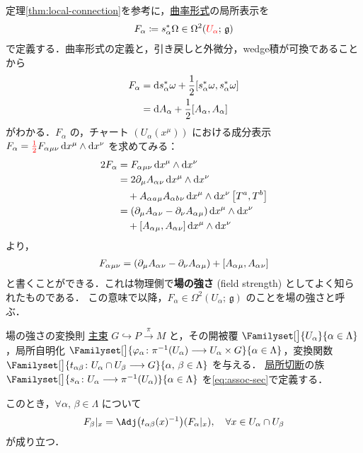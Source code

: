 \documentclass[geometry_main]{subfiles}
\begin{document}
定理\ref{thm:local-connection}を参考に，\hyperref[def:curvature]{曲率形式}の局所表示を
\begin{align}
    \label{def:field-strength}
    F_\alpha \coloneqq s_\alpha^* \Omega \in \Omega^2 (\textcolor{red}{U_\alpha};\, \mathfrak{g})
\end{align}
で定義する．曲率形式の定義と，引き戻しと外微分，wedge積が可換であることから
\begin{align}
    F_\alpha 
    &= \dd s_\alpha^* \omega + \frac{1}{2} \comm{s_\alpha^* \omega}{s_\alpha^* \omega} \\
    &= \dd{A_\alpha} + \frac{1}{2} \comm{A_\alpha}{A_\alpha}
\end{align}
がわかる．$F_\alpha$ の，チャート $(U_\alpha (x^\mu))$ における成分表示 $F_\alpha = \textcolor{red}{\frac{1}{2}} F_\alpha{}_{\mu\nu} \dd{x^\mu} \wedge \dd{x^\nu}$ を求めてみる：
\begin{align}
    2F_\alpha
    &= F_\alpha{}_{\mu\nu} \dd{x^\mu} \wedge \dd{x^\nu} \\
    &= 2\partial_\mu A_\alpha{}_\nu \dd{x^\mu} \wedge \dd{x^\nu}  \\
    &\quad + A_\alpha{}_a{}_{\mu} A_\alpha{}_b{}_\nu \dd{x^\mu} \wedge \dd{x^\nu} \comm{T^a}{T^b} \\
    &= (\partial_\mu A_\alpha{}_\nu - \partial_\nu A_\alpha{}_\mu) \dd{x^\mu} \wedge \dd{x^\nu} \\
    &\quad + \comm{A_\alpha{}_\mu}{A_\alpha{}_\nu} \dd{x^\mu} \wedge \dd{x^\nu}
\end{align}
より，
\begin{align}
    F_\alpha{}_{\mu\nu} = (\partial_\mu A_\alpha{}_\nu - \partial_\nu A_\alpha{}_\mu) + \comm{A_\alpha{}_\mu}{A_\alpha{}_\nu} 
\end{align}
と書くことができる．これは物理側で\textbf{場の強さ} (field strength) としてよく知られたものである．
この意味で以降，$F_\alpha \in \Omega^2(U_\alpha;\, \mathfrak{g})$ のことを場の強さと呼ぶ．

\begin{mytheo}[label=thm:curvature-local]{場の強さの変換則}
    \hyperref[def.PFD]{主束} $G \hookrightarrow P \xrightarrow{\pi} M$ と，その開被覆 $\Familyset[\big]{U_\alpha}{\alpha \in \Lambda}$，局所自明化 $\Familyset[\big]{\varphi_\alpha \colon \pi^{-1}(U_\alpha) \lto U_\alpha \times G}{\alpha \in \Lambda}$，変換関数 $\Familyset[\big]{t_{\alpha\beta} \colon U_\alpha \cap U_\beta \lto G}{\alpha,\, \beta \in \Lambda}$ を与える．
    \hyperref[def.section]{局所切断}の族 $\Familyset[\big]{s_\alpha \colon U_\alpha \lto \pi^{-1}(U_\alpha)}{\alpha \in \Lambda}$ を\eqref{eq:assoc-sec}で定義する． 
    
    このとき，$\forall \alpha,\, \beta \in \Lambda$ について
    \begin{align}
        F_{\beta}|_x = \Adj \bigl( t_{\alpha\beta}(x)^{-1} \bigr)(F_\alpha|_x),\quad \forall x \in U_\alpha \cap U_\beta
    \end{align}
    が成り立つ．
\end{mytheo}
\end{document}
